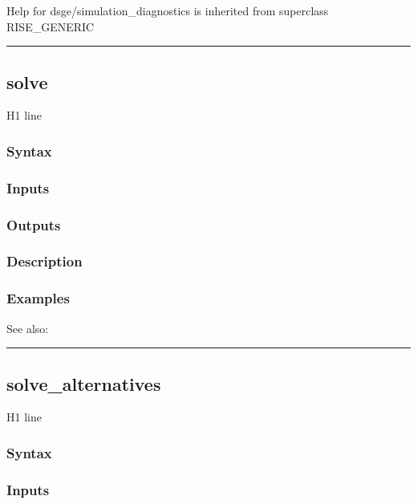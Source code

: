 \documentclass[letterpaper,10pt,english]{sphinxmanual}
\begin{document}
Help for dsge/simulation\_diagnostics is inherited from superclass RISE\_GENERIC


\bigskip\hrule{}\bigskip



\subsection{solve}
\label{classes/models/@dsge/dsge:solve}\label{classes/models/@dsge/dsge:id179}
H1 line


\subsubsection{Syntax}
\label{classes/models/@dsge/dsge:id180}

\subsubsection{Inputs}
\label{classes/models/@dsge/dsge:id181}

\subsubsection{Outputs}
\label{classes/models/@dsge/dsge:id182}

\subsubsection{Description}
\label{classes/models/@dsge/dsge:id183}

\subsubsection{Examples}
\label{classes/models/@dsge/dsge:id184}
See also:


\bigskip\hrule{}\bigskip



\subsection{solve\_alternatives}
\label{classes/models/@dsge/dsge:id185}\label{classes/models/@dsge/dsge:solve-alternatives}
H1 line


\subsubsection{Syntax}
\label{classes/models/@dsge/dsge:id186}

\subsubsection{Inputs}
\label{classes/models/@dsge/dsge:id187}
\end{document}
